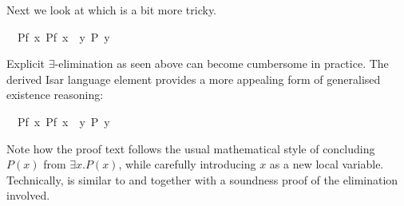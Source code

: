 \begin{isabellebody}
\begin{isamarkuptext}
Next we look at \isa{{\isasymexists}} which is a bit more tricky.%
\end{isamarkuptext}%
\isamarkuptrue%
\ \ Pf{\isacharcolon}\ {\isachardoublequote}{\isasymexists}x{\isachardot}\ P{\isacharparenleft}f\ x{\isacharparenright}{\isachardoublequote}\ \ {\isachardoublequote}{\isasymexists}y{\isachardot}\ P\ y{\isachardoublequote}\isanewline
\isamarkupfalse%
\isamarkupfalse%
\isamarkupfalse%
\isamarkupfalse%
\isamarkupfalse%
\isamarkupfalse%
\isamarkupfalse%
\isamarkupfalse%
\isamarkupfalse%
\isamarkupfalse%
\isamarkupfalse%
%
\begin{isamarkuptext}%
\noindent Explicit $\exists$-elimination as seen above can become
cumbersome in practice.  The derived Isar language element
 provides a more appealing form of generalised
existence reasoning:%
\end{isamarkuptext}%
\isamarkuptrue%
\ \ Pf{\isacharcolon}\ {\isachardoublequote}{\isasymexists}x{\isachardot}\ P{\isacharparenleft}f\ x{\isacharparenright}{\isachardoublequote}\ \ {\isachardoublequote}{\isasymexists}y{\isachardot}\ P\ y{\isachardoublequote}\isanewline
\isamarkupfalse%
\isamarkupfalse%
\isamarkupfalse%
\isamarkupfalse%
\isamarkupfalse%
\isamarkupfalse%
\isamarkupfalse%
\isamarkupfalse%
%
\begin{isamarkuptext}%
\noindent Note how the proof text follows the usual mathematical style
of concluding $P(x)$ from $\exists x. P(x)$, while carefully introducing $x$
as a new local variable.  Technically,  is similar to
 and  together with a soundness proof of
the elimination involved.


\end{isamarkuptext}
\end{isabellebody}
